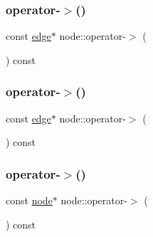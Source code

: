 \mbox{\label{classnode_a71b168f27cc7338906814f6a3ecc176f}} 
\subsubsection{\texorpdfstring{operator-\/$>$()}{operator->()}\hspace{0.1cm}{\footnotesize\ttfamily [1/3]}}
{\footnotesize\ttfamily const \mbox{\hyperlink{classedge}{edge}}$\ast$ node\+::operator-\/$>$ (\begin{DoxyParamCaption}{ }\end{DoxyParamCaption}) const}

\mbox{\label{classnode_a71b168f27cc7338906814f6a3ecc176f}} 
\subsubsection{\texorpdfstring{operator-\/$>$()}{operator->()}\hspace{0.1cm}{\footnotesize\ttfamily [2/3]}}
{\footnotesize\ttfamily const \mbox{\hyperlink{classedge}{edge}}$\ast$ node\+::operator-\/$>$ (\begin{DoxyParamCaption}{ }\end{DoxyParamCaption}) const}

\mbox{\label{classnode_a82d46c8753db26b34382fcfd9f887c12}} 
\subsubsection{\texorpdfstring{operator-\/$>$()}{operator->()}\hspace{0.1cm}{\footnotesize\ttfamily [3/3]}}
{\footnotesize\ttfamily const \mbox{\hyperlink{classnode}{node}}$\ast$ node\+::operator-\/$>$ (\begin{DoxyParamCaption}{ }\end{DoxyParamCaption}) const}

\mbox{\label{classnode_a7ae20e73507364af0c1df22ecd0df444}} 
